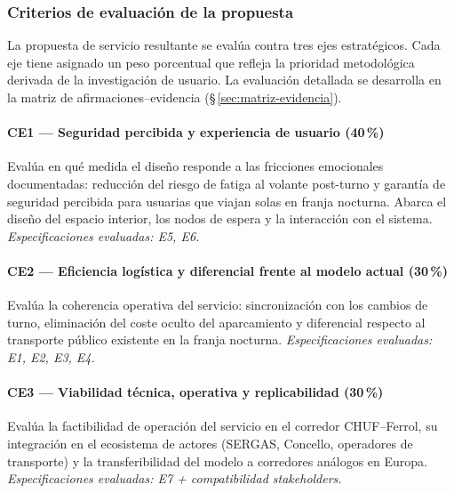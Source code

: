 
\subsubsection{Criterios de evaluación de la propuesta}
\label{sec:pliego-criterios}

La propuesta de servicio resultante se evalúa contra tres ejes
estratégicos. Cada eje tiene asignado un peso porcentual que
refleja la prioridad metodológica derivada de la investigación
de usuario. La evaluación detallada se desarrolla en la matriz
de afirmaciones--evidencia (§\,\ref{sec:matriz-evidencia}).

\paragraph{CE1 — Seguridad percibida y experiencia de usuario (40\,\%)}

Evalúa en qué medida el diseño responde a las fricciones emocionales
documentadas: reducción del riesgo de fatiga al volante post-turno y
garantía de seguridad percibida para usuarias que viajan solas en
franja nocturna. Abarca el diseño del espacio interior, los nodos de
espera y la interacción con el sistema.
\emph{Especificaciones evaluadas: E5, E6.}

\paragraph{CE2 — Eficiencia logística y diferencial frente al modelo actual (30\,\%)}

Evalúa la coherencia operativa del servicio: sincronización con los
cambios de turno, eliminación del coste oculto del aparcamiento y
diferencial respecto al transporte público existente en la franja
nocturna.
\emph{Especificaciones evaluadas: E1, E2, E3, E4.}

\paragraph{CE3 — Viabilidad técnica, operativa y replicabilidad (30\,\%)}

Evalúa la factibilidad de operación del servicio en el corredor
\acs{CHUF}--Ferrol, su integración en el ecosistema de actores
(\acs{SERGAS}, Concello, operadores de transporte) y la
transferibilidad del modelo a corredores análogos en Europa.
\emph{Especificaciones evaluadas: E7 + compatibilidad stakeholders.}

